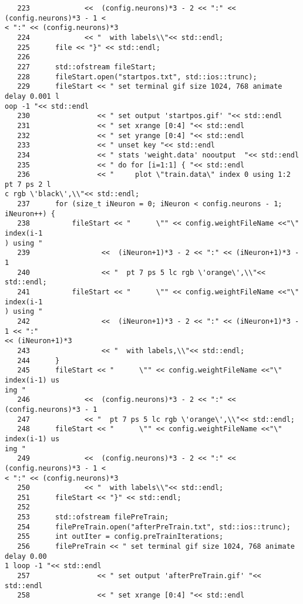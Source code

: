 \begin{verbatim}
   223	           <<  (config.neurons)*3 - 2 << ":" << (config.neurons)*3 - 1 <
< ":" << (config.neurons)*3
   224	           << "  with labels\\"<< std::endl;
   225	    file << "}" << std::endl;
   226	
   227	    std::ofstream fileStart;
   228	    fileStart.open("startpos.txt", std::ios::trunc);
   229	    fileStart << " set terminal gif size 1024, 768 animate delay 0.001 l
oop -1 "<< std::endl
   230	              << " set output 'startpos.gif' "<< std::endl
   231	              << " set xrange [0:4] "<< std::endl
   232	              << " set yrange [0:4] "<< std::endl
   233	              << " unset key "<< std::endl              
   234	              << " stats 'weight.data' nooutput  "<< std::endl
   235	              << " do for [i=1:1] { "<< std::endl
   236	              << "     plot \"train.data\" index 0 using 1:2 pt 7 ps 2 l
c rgb \'black\',\\"<< std::endl;
   237	    for (size_t iNeuron = 0; iNeuron < config.neurons - 1; iNeuron++) {
   238	        fileStart << "      \"" << config.weightFileName <<"\" index(i-1
) using " 
   239	               <<  (iNeuron+1)*3 - 2 << ":" << (iNeuron+1)*3 - 1
   240	               << "  pt 7 ps 5 lc rgb \'orange\',\\"<< std::endl;
   241	        fileStart << "      \"" << config.weightFileName <<"\" index(i-1
) using " 
   242	               <<  (iNeuron+1)*3 - 2 << ":" << (iNeuron+1)*3 - 1 << ":" 
<< (iNeuron+1)*3
   243	               << "  with labels,\\"<< std::endl;
   244	    }
   245	    fileStart << "      \"" << config.weightFileName <<"\" index(i-1) us
ing " 
   246	           <<  (config.neurons)*3 - 2 << ":" << (config.neurons)*3 - 1
   247	           << "  pt 7 ps 5 lc rgb \'orange\',\\"<< std::endl;
   248	    fileStart << "      \"" << config.weightFileName <<"\" index(i-1) us
ing " 
   249	           <<  (config.neurons)*3 - 2 << ":" << (config.neurons)*3 - 1 <
< ":" << (config.neurons)*3
   250	           << "  with labels\\"<< std::endl;
   251	    fileStart << "}" << std::endl;
   252	
   253	    std::ofstream filePreTrain;
   254	    filePreTrain.open("afterPreTrain.txt", std::ios::trunc);
   255	    int outIter = config.preTrainIterations;
   256	    filePreTrain << " set terminal gif size 1024, 768 animate delay 0.00
1 loop -1 "<< std::endl
   257	              << " set output 'afterPreTrain.gif' "<< std::endl
   258	              << " set xrange [0:4] "<< std::endl

\end{verbatim}
